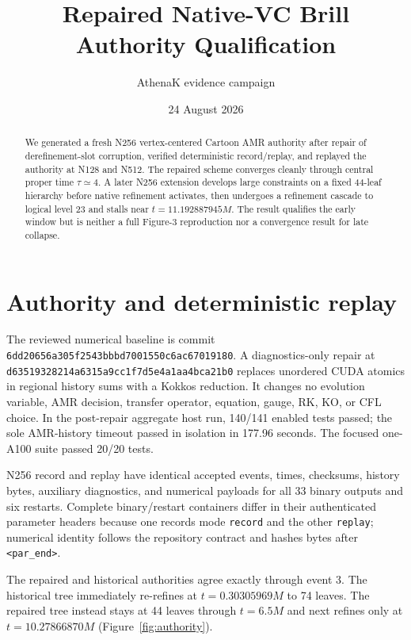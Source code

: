 \documentclass[11pt]{article}
\title{Repaired Native-VC Brill Authority Qualification}
\author{AthenaK evidence campaign}
\date{24 August 2026}
\begin{document}
\maketitle

\begin{center}
\end{center}

\begin{abstract}
We generated a fresh N256 vertex-centered Cartoon AMR authority after repair
of derefinement-slot corruption, verified deterministic record/replay, and
replayed the authority at N128 and N512.  The repaired scheme converges cleanly
through central proper time $\tau\simeq4$.  A later N256 extension develops
large constraints on a fixed 44-leaf hierarchy before native refinement
activates, then undergoes a refinement cascade to logical level 23 and stalls
near $t=11.192887945M$.  The result qualifies the early window but is neither a
full Figure-3 reproduction nor a convergence result for late collapse.
\end{abstract}

\section{Authority and deterministic replay}

The reviewed numerical baseline is commit
\texttt{6dd20656a305f2543bbbd7001550c6ac67019180}.  A diagnostics-only repair at
\texttt{d63519328214a6315a9cc1f7d5e4a1aa4bca21b0} replaces unordered CUDA
atomics in regional history sums with a Kokkos reduction.  It changes no
evolution variable, AMR decision, transfer operator, equation, gauge, RK, KO,
or CFL choice.  In the post-repair aggregate host run, 140/141 enabled tests
passed; the sole AMR-history timeout passed in isolation in 177.96 seconds.
The focused one-A100 suite passed 20/20 tests.

N256 record and replay have identical accepted events, times, checksums,
history bytes, auxiliary diagnostics, and numerical payloads for all 33 binary
outputs and six restarts.  Complete binary/restart containers differ in their
authenticated parameter headers because one records mode \texttt{record} and
the other \texttt{replay}; numerical identity follows the repository contract
and hashes bytes after \texttt{<par\_end>}.

The repaired and historical authorities agree exactly through event 3.  The
historical tree immediately re-refines at $t=0.30305969M$ to 74 leaves.  The
repaired tree instead stays at 44 leaves through $t=6.5M$ and next refines only
at $t=10.27866870M$ (Figure~\ref{fig:authority}).
\end{document}
